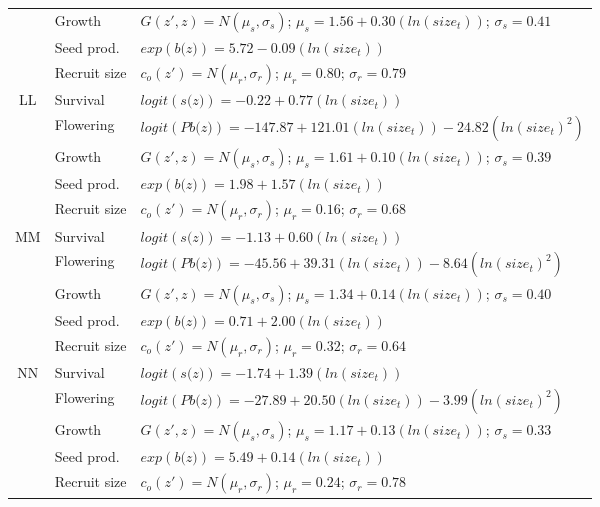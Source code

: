 \documentclass[12pt, letterpaper]{article}
\begin{document}
\begin{spacing}{1.3}
\begin{longtable}[ht!]{c|l|p{}}
        \rowcolor[gray]{.95} & Growth  &  $G(z',z) = N(\mu_s, \sigma_s)$; $\mu_s = 1.56 + 0.30(ln(size_t))$; $\sigma_s = 0.41$\\
         & Seed prod.  & $exp(\textit{b(z)}) = 5.72 -0.09(ln(size_t))$  \\
         \rowcolor[gray]{.95}& Recruit size  &  $c_o(z') = N(\mu_r, \sigma_r)$; $\mu_r = 0.80$; $\sigma_r = 0.79$ \\
         \hline
         LL  &  Survival  &  $logit(\textit{s(z)})= -0.22+0.77(ln(size_t))$ \\
         \rowcolor[gray]{.95}& Flowering  & $logit(\textit{Pb(z)})  = -147.87 + 121.01(ln(size_t)) -24.82(ln(size_t)^2)$ \\
         & Growth  &  $G(z',z) = N(\mu_s, \sigma_s)$; $\mu_s = 1.61 + 0.10(ln(size_t))$; $\sigma_s = 0.39$\\
         \rowcolor[gray]{.95}& Seed prod.  & $exp(\textit{b(z)}) = 1.98 + 1.57(ln(size_t))$  \\
         & Recruit size  &  $c_o(z') = N(\mu_r, \sigma_r)$; $\mu_r = 0.16$; $\sigma_r = 0.68$ \\
         \hline
         \rowcolor[gray]{.95}MM  &  Survival  &  $logit(\textit{s(z)})= -1.13+0.60(ln(size_t))$ \\
         & Flowering  & $logit(\textit{Pb(z)})  = -45.56 + 39.31(ln(size_t)) -8.64(ln(size_t)^2)$ \\
         \rowcolor[gray]{.95}& Growth  &  $G(z',z) = N(\mu_s, \sigma_s)$; $\mu_s = 1.34 + 0.14(ln(size_t))$; $\sigma_s = 0.40$\\
         & Seed prod.  & $exp(\textit{b(z)}) = 0.71 + 2.00(ln(size_t))$  \\
         \rowcolor[gray]{.95}& Recruit size  &  $c_o(z') = N(\mu_r, \sigma_r)$; $\mu_r = 0.32$; $\sigma_r = 0.64$ \\
         \hline
         NN  &  Survival  &  $logit(\textit{s(z)})= -1.74+1.39(ln(size_t))$ \\
         \rowcolor[gray]{.95}& Flowering  & $logit(\textit{Pb(z)})  = -27.89 + 20.50(ln(size_t)) -3.99(ln(size_t)^2)$ \\
         & Growth  &  $G(z',z) = N(\mu_s, \sigma_s)$; $\mu_s = 1.17 + 0.13(ln(size_t))$; $\sigma_s = 0.33$\\
         \rowcolor[gray]{.95}& Seed prod.  & $exp(\textit{b(z)}) =  5.49+ 0.14(ln(size_t))$  \\
         & Recruit size  &  $c_o(z') = N(\mu_r, \sigma_r)$; $\mu_r = 0.24$; $\sigma_r = 0.78$ \\
         \end{longtable}
\end{spacing}
\end{document}
